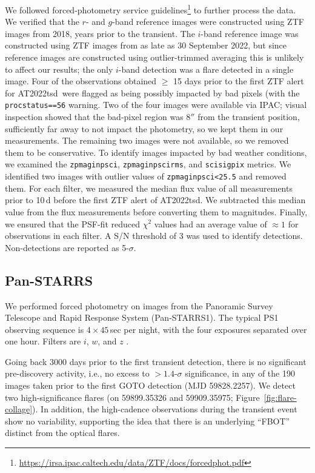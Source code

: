 \documentclass{nature_plusfigure}
\newcommand{\at}{AT2022tsd}
\begin{document}
\begin{methods}
We followed forced-photometry service guidelines\footnote{\url{https://irsa.ipac.caltech.edu/data/ZTF/docs/forcedphot.pdf}} to further process the data.
We verified that the $r$- and $g$-band reference images were constructed using ZTF images from 2018, years prior to the transient. The $i$-band reference image was constructed using ZTF images from as late as 30 September 2022, but since reference images are constructed using outlier-trimmed averaging\cite{Masci2018} this is unlikely to affect our results; the only $i$-band detection was a flare detected in a single image. 
Four of the observations obtained $\geq$ 15 days prior to the first ZTF alert for \at\ were flagged as being possibly impacted by bad pixels (with the \texttt{procstatus==56} warning.
Two of the four images were available via IPAC; visual inspection showed that the bad-pixel region was 8$''$ from the transient position, sufficiently far away to not impact the photometry, so we kept them in our measurements.
The remaining two images were not available, so we removed them to be conservative.
To identify images impacted by bad weather conditions, we examined the \texttt{zpmaginpsci}, \texttt{zpmaginpscirms}, and \texttt{scisigpix} metrics. We identified two images with outlier values of \texttt{zpmaginpsci<25.5} and removed them.
For each filter, we measured the median flux value of all measurements prior to 10\,d before the first ZTF alert of \at. We subtracted this median value from the flux measurements before converting them to magnitudes.
Finally, we ensured that the PSF-fit reduced $\chi^2$ values had an average value of $\approx1$ for observations in each filter.
A S/N threshold of 3 was used to identify detections. Non-detections are reported as 5-$\sigma$.

\subsection{Pan-STARRS}
\label{sec:panstarrs}

We performed forced photometry on images from the Panoramic Survey Telescope and Rapid Response System (Pan-STARRS1\cite{Chambers2016}).
The typical PS1 observing sequence is $4\times45$\,sec per night, with the
four exposures separated over one hour. Filters are $i$, $w$, and $z$ \cite{Tonry2012}.

Going back 3000 days prior to the first transient detection, there is no significant pre-discovery activity, i.e., no excess to $>1.4$-$\sigma$ significance, in any of the 190 images taken prior to the first GOTO detection (MJD 59828.2257).
We detect two high-significance flares (on 59899.35326 and 59909.35975; Figure~\ref{fig:flare-collage}).
In addition, the high-cadence observations during the transient event show no variability, supporting the idea that there is an underlying ``FBOT'' distinct from the optical flares.


\end{methods}
\end{document}
